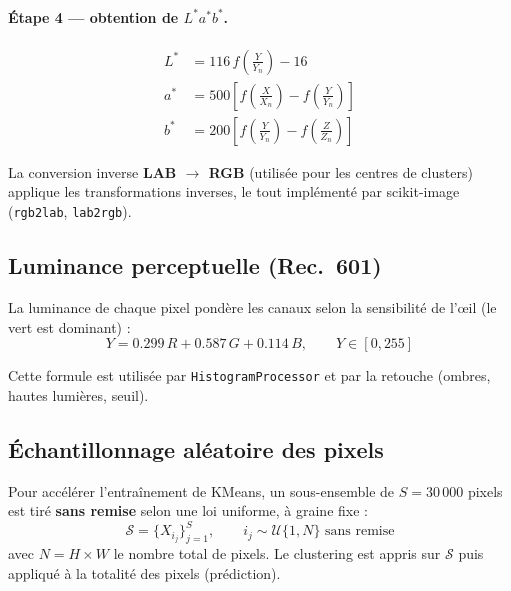 \documentclass[11pt,a4paper]{article}
\begin{document}
\paragraph{Étape 4 --- obtention de $L^*a^*b^*$.}
\begin{align}
  L^* &= 116\, f\!\left(\frac{Y}{Y_n}\right) - 16
  \label{eq:L}\\[4pt]
  a^* &= 500 \left[ f\!\left(\frac{X}{X_n}\right) - f\!\left(\frac{Y}{Y_n}\right) \right]
  \label{eq:a}\\[4pt]
  b^* &= 200 \left[ f\!\left(\frac{Y}{Y_n}\right) - f\!\left(\frac{Z}{Z_n}\right) \right]
  \label{eq:b}
\end{align}

La conversion inverse \textbf{LAB $\rightarrow$ RGB} (utilisée pour les
centres de clusters) applique les transformations inverses, le tout
implémenté par scikit-image (\texttt{rgb2lab}, \texttt{lab2rgb}).

\subsection{Luminance perceptuelle (Rec.~601)}

La luminance de chaque pixel pondère les canaux selon la sensibilité de
l'œil (le vert est dominant) :
\begin{equation}
  Y = 0.299\,R + 0.587\,G + 0.114\,B, \qquad Y \in [0, 255]
  \label{eq:luma}
\end{equation}

Cette formule est utilisée par \texttt{HistogramProcessor} et par la
retouche (ombres, hautes lumières, seuil).

\subsection{Échantillonnage aléatoire des pixels}

Pour accélérer l'entraînement de KMeans, un sous-ensemble de
$S = 30\,000$ pixels est tiré \textbf{sans remise} selon une loi uniforme,
à graine fixe :
\begin{equation}
  \mathcal{S} = \{ X_{i_j} \}_{j=1}^{S}, \qquad
  i_j \sim \mathcal{U}\{1, N\} \text{ sans remise}
  \label{eq:sample}
\end{equation}
avec $N = H \times W$ le nombre total de pixels. Le clustering est appris
sur $\mathcal{S}$ puis appliqué à la totalité des pixels (prédiction).
\end{document}
